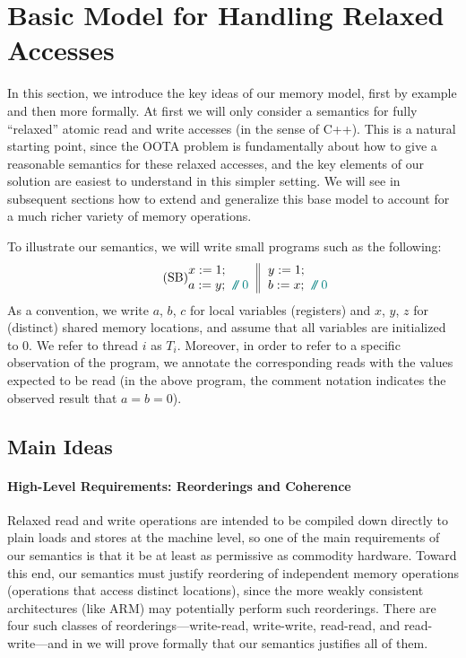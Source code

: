 \section{Basic Model for Handling Relaxed Accesses}
\label{sec:relaxed}

In this section, we introduce the key ideas of our memory model, first
by example and then more formally.  At first we will only consider a
semantics for fully ``relaxed'' atomic read and write accesses (in the
sense of C++).  This is a natural starting point, since the OOTA
problem is fundamentally about how to give a reasonable semantics for
these relaxed accesses, and the key elements of our solution are
easiest to understand in this simpler setting.  We will see in
subsequent sections how to extend and generalize this base model to
account for a much richer variety of memory operations.

To illustrate our semantics, we will write small programs such as the
following:
\begin{equation}\label{eq:SB}\tag{SB}
\inarrII{x:=1;\\a:=y;\comment{0}}{y:=1;\\b:=x;\comment{0}}
\end{equation}
As a convention, we write $a$, $b$, $c$ for local variables
(registers) and $x$, $y$, $z$ for (distinct) shared memory locations,
and assume that all variables are initialized to $0$.  
We refer to thread $i$ as $T_i$.  Moreover, in order to
refer to a specific observation of the program, we annotate the
corresponding reads with the values expected to be read (\eg in the
above program, the comment notation indicates the observed result that
$a = b = 0$).

\subsection{Main Ideas}

\paragraph{High-Level Requirements: Reorderings and Coherence}

Relaxed read and write operations are intended to be compiled down
directly to plain loads and stores at the machine level, so one of the
main requirements of our semantics is that it be at least as
permissive as commodity hardware.  Toward this end, our semantics must
justify reordering of independent memory operations (\ie operations
that access distinct locations), since the more weakly consistent
architectures (like ARM) may potentially perform such reorderings.
There are four such classes of reorderings---write-read, write-write,
read-read, and read-write---and in  we will prove formally
that our semantics justifies all of them.

